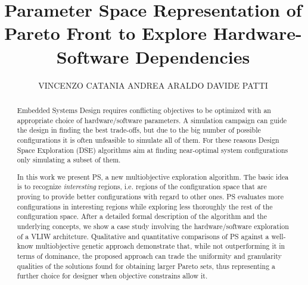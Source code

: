 \documentclass[prodmode,acmtecs]{acmsmall}
\begin{document}


\title{Parameter Space Representation of Pareto Front to
Explore Hardware-Software Dependencies}
\author{VINCENZO CATANIA
ANDREA ARALDO
DAVIDE PATTI
}

\begin{abstract}
Embedded Systems Design requires conflicting objectives to be
optimized with an appropriate choice of hardware/software parameters.
A simulation campaign can guide the design in finding the best
trade-offs, but due to the big number of possible configurations it
is often unfeasible to simulate all of them. For these reasons Design Space
Exploration (DSE) algorithms aim at finding near-optimal system
configurations only simulating a subset of them.

In this work we present PS, a new multiobjective exploration
algorithm. The basic idea is to recognize \emph{interesting} regions, i.e.
regions of the configuration space that are proving to provide better
configurations with regard to other ones. PS evaluates more configurations in
interesting regions while exploring less thoroughly the rest of the
configuration space. After a detailed formal description of the
algorithm and the underlying concepts, we show a 
case study involving the hardware/software exploration of a VLIW
architcture. Qualitative and quantitative comparisons of PS
against a well-know multiobjective genetic approach demonstrate that,
while not outperforming it in terms of dominance, the proposed
approach can trade the uniformity and granularity qualities of the
solutions found for obtaining larger Pareto sets, thus representing a
further choice for designer when objective constrains allow it.
\end{abstract}




\end{document}
